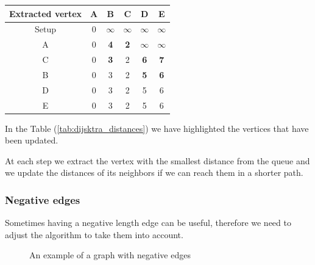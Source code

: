 \documentclass[10pt]{extarticle}
\begin{document}
\begin{center}
    \begin{tabular}{ |c|c|c|c|c|c| }
        \hline
        Extracted vertex & A & B          & C          & D          & E          \\
        \hline
        Setup            & 0 & $\infty$   & $\infty$   & $\infty$   & $\infty$   \\
        A                & 0 & \textbf{4} & \textbf{2} & $\infty$   & $\infty$   \\
        C                & 0 & \textbf{3} & 2          & \textbf{6} & \textbf{7} \\
        B                & 0 & 3          & 2          & \textbf{5} & \textbf{6} \\
        D                & 0 & 3          & 2          & 5          & 6          \\
        E                & 0 & 3          & 2          & 5          & 6          \\
        \hline
    \end{tabular}
    \label{tab:dijsktra_distances}
\end{center}

In the Table (\ref{tab:dijsktra_distances}) we have highlighted the vertices that have been updated.

At each step we extract the vertex with the smallest distance from the queue and we update the distances of its neighbors if we can reach them in a shorter path.

\subsubsection{Negative edges}

Sometimes having a negative length edge can be useful, therefore we need to adjust the algorithm to take them into account.

\begin{figure}[H]
    \centering

    \caption{An example of a graph with negative edges}
    \label{fig:negative_edges}
\end{figure}
\end{document}
